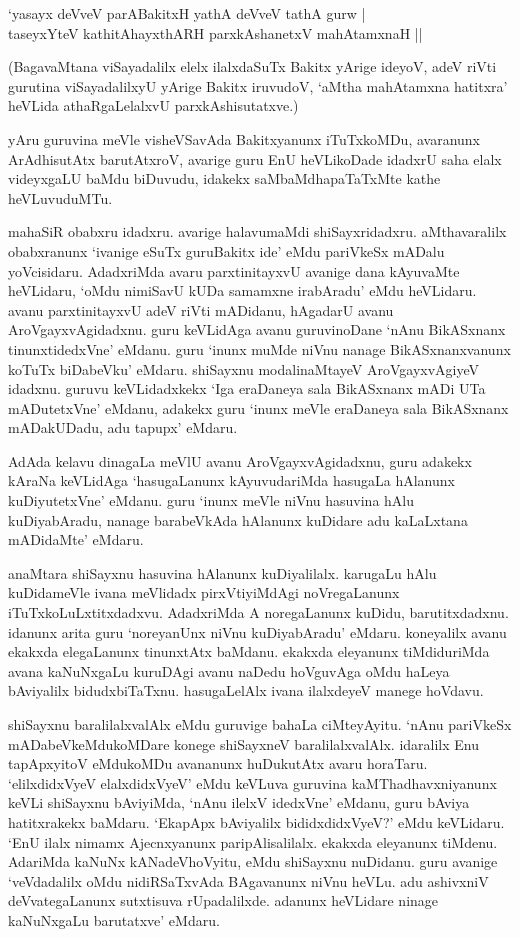 \begin{shloka} 
`yasayx deVveV parABakitxH yathA deVveV tathA gurw |\\
taseyxYteV kathitAhayxthARH parxkAshanetxV mahAtamxnaH ||
\end{shloka}

(BagavaMtana viSayadalilx elelx ilalxdaSuTx Bakitx yArige ideyoV, adeV riVti gurutina viSayadalilxyU yArige Bakitx iruvudoV, `aMtha mahAtamxna hatitxra' heVLida athaRgaLelalxvU parxkAshisutatxve.)
 
 yAru guruvina meVle visheVSavAda Bakitxyanunx iTuTxkoMDu, avaranunx ArAdhisutAtx barutAtxroV, avarige guru EnU heVLikoDade idadxrU saha elalx videyxgaLU baMdu biDuvudu, idakekx saMbaMdhapaTaTxMte kathe heVLuvuduMTu. 
 
 mahaSiR obabxru idadxru. avarige halavumaMdi shiSayxridadxru. aMthavaralilx obabxranunx `ivanige eSuTx guruBakitx ide' eMdu pariVkeSx mADalu yoVcisidaru. AdadxriMda avaru parxtinitayxvU avanige dana kAyuvaMte heVLidaru, `oMdu nimiSavU kUDa samamxne irabAradu' eMdu heVLidaru. avanu parxtinitayxvU adeV riVti mADidanu, hAgadarU avanu AroVgayxvAgidadxnu. guru keVLidAga avanu guruvinoDane `nAnu BikASxnanx tinunxtidedxVne' eMdanu. guru `inunx muMde niVnu nanage BikASxnanxvanunx koTuTx biDabeVku' eMdaru. shiSayxnu modalinaMtayeV AroVgayxvAgiyeV idadxnu. guruvu keVLidadxkekx `Iga eraDaneya sala BikASxnanx mADi UTa mADutetxVne' eMdanu, adakekx guru `inunx meVle eraDaneya sala BikASxnanx mADakUDadu, adu tapupx' eMdaru. 
 
 
 AdAda kelavu dinagaLa meVlU avanu AroVgayxvAgidadxnu, guru adakekx kAraNa keVLidAga `hasugaLanunx kAyuvudariMda hasugaLa hAlanunx kuDiyutetxVne' eMdanu. guru `inunx meVle niVnu hasuvina hAlu kuDiyabAradu, nanage barabeVkAda hAlanunx kuDidare adu kaLaLxtana mADidaMte' eMdaru. 
 
 
 anaMtara shiSayxnu hasuvina hAlanunx kuDiyalilalx. karugaLu hAlu kuDidameVle ivana meVlidadx pirxVtiyiMdAgi noVregaLanunx iTuTxkoLuLxtitxdadxvu. AdadxriMda A noregaLanunx kuDidu, barutitxdadxnu. idanunx arita guru `noreyanUnx niVnu kuDiyabAradu' eMdaru. koneyalilx avanu ekakxda elegaLanunx tinunxtAtx baMdanu. ekakxda eleyanunx tiMdiduriMda avana kaNuNxgaLu kuruDAgi avanu naDedu hoVguvAga oMdu haLeya bAviyalilx bidudxbiTaTxnu. hasugaLelAlx ivana ilalxdeyeV manege hoVdavu. 
 
 shiSayxnu baralilalxvalAlx eMdu guruvige bahaLa ciMteyAyitu. `nAnu pariVkeSx mADabeVkeMdukoMDare konege shiSayxneV baralilalxvalAlx. idaralilx Enu tapApxyitoV eMdukoMDu avananunx huDukutAtx avaru horaTaru. `elilxdidxVyeV elalxdidxVyeV' eMdu keVLuva guruvina kaMThadhavxniyanunx keVLi shiSayxnu bAviyiMda, `nAnu ilelxV idedxVne' eMdanu, guru bAviya hatitxrakekx baMdaru. `EkapApx bAviyalilx bididxdidxVyeV?' eMdu keVLidaru. `EnU ilalx nimamx Ajecnxyanunx paripAlisalilalx. ekakxda eleyanunx tiMdenu. AdariMda kaNuNx kANadeVhoVyitu, eMdu shiSayxnu nuDidanu. guru avanige `veVdadalilx oMdu nidiRSaTxvAda BAgavanunx niVnu heVLu. adu ashivxniV deVvategaLanunx sutxtisuva rUpadalilxde. adanunx heVLidare ninage kaNuNxgaLu barutatxve' eMdaru. 
 
